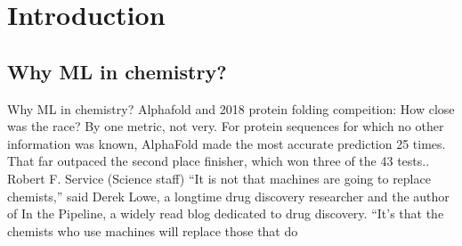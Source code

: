 \section{Introduction}
\subsection{Why ML in chemistry?}
\begin{frame}{Why ML in chemistry?}
Alphafold and 2018 protein folding compeition:
How close was the race? By one metric, not very. For protein sequences for which no other information was known, AlphaFold made the most accurate prediction 25 times. That far outpaced the second place finisher, which won three of the 43 tests.. 
Robert F. Service (Science staff)
“It is not that machines are going to replace chemists,” said Derek Lowe, a longtime drug discovery researcher and the author of In the Pipeline, a widely read blog dedicated to drug discovery. “It’s that the chemists who use machines will replace those that do
\end{frame}